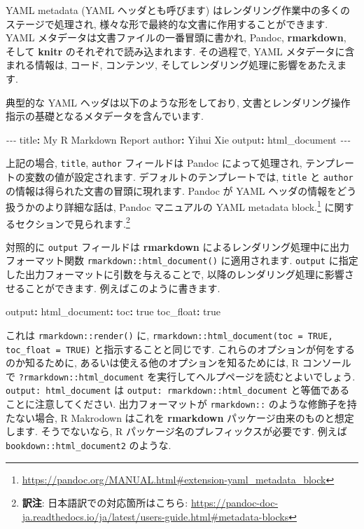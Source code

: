 \documentclass[
  11pt,
  lualatex,ja=standard,jafont=noto]{bxjsreport}
\newenvironment{Shaded}{\begin{snugshade}}{\end{snugshade}}
\newcommand{\AttributeTok}[1]{\textcolor[rgb]{0.77,0.63,0.00}{#1}}
\newcommand{\CharTok}[1]{\textcolor[rgb]{0.31,0.60,0.02}{#1}}
\newcommand{\FunctionTok}[1]{\textcolor[rgb]{0.00,0.00,0.00}{#1}}
\newcommand{\KeywordTok}[1]{\textcolor[rgb]{0.13,0.29,0.53}{\textbf{#1}}}
\newcommand{\PreprocessorTok}[1]{\textcolor[rgb]{0.56,0.35,0.01}{\textit{#1}}}
\renewcommand{\href}[2]{#2\footnote{\url{#1}}}
\begin{document}
YAML metadata (YAML ヘッダとも呼びます) はレンダリング作業中の多くのステージで処理され, 様々な形で最終的な文書に作用することができます. YAML メタデータは文書ファイルの一番冒頭に書かれ, Pandoc, \textbf{rmarkdown}, そして \textbf{knitr} のそれぞれで読み込まれます. その過程で, YAML メタデータに含まれる情報は, コード, コンテンツ, そしてレンダリング処理に影響をあたえます.

典型的な YAML ヘッダは以下のような形をしており, 文書とレンダリング操作指示の基礎となるメタデータを含んでいます.

\begin{Shaded}
\begin{Highlighting}[]
\PreprocessorTok{{-}{-}{-}}
\FunctionTok{title}\KeywordTok{:}\AttributeTok{ My R Markdown Report}
\FunctionTok{author}\KeywordTok{:}\AttributeTok{ Yihui Xie}
\FunctionTok{output}\KeywordTok{:}\AttributeTok{ html\_document}
\PreprocessorTok{{-}{-}{-}}
\end{Highlighting}
\end{Shaded}

上記の場合, \texttt{title}, \texttt{author} フィールドは Pandoc によって処理され, テンプレートの変数の値が設定されます. デフォルトのテンプレートでは, \texttt{title} と \texttt{author} の情報は得られた文書の冒頭に現れます. Pandoc が YAML ヘッダの情報をどう扱うかのより詳細な話は, Pandoc マニュアルの \href{https://pandoc.org/MANUAL.html\#extension-yaml_metadata_block}{YAML metadata block.} に関するセクションで見られます.\footnote{\textbf{訳注}: 日本語訳での対応箇所はこちら: \url{https://pandoc-doc-ja.readthedocs.io/ja/latest/users-guide.html\#metadata-blocks}}

対照的に \texttt{output} フィールドは \textbf{rmarkdown} によるレンダリング処理中に出力フォーマット関数 \texttt{rmarkdown::html\_document()} に適用されます. \texttt{output} に指定した出力フォーマットに引数を与えることで, 以降のレンダリング処理に影響させることができます. 例えばこのように書きます.

\begin{Shaded}
\begin{Highlighting}[]
\FunctionTok{output}\KeywordTok{:}
\AttributeTok{  }\FunctionTok{html\_document}\KeywordTok{:}
\AttributeTok{    }\FunctionTok{toc}\KeywordTok{:}\AttributeTok{ }\CharTok{true}
\AttributeTok{    }\FunctionTok{toc\_float}\KeywordTok{:}\AttributeTok{ }\CharTok{true}
\end{Highlighting}
\end{Shaded}

これは \texttt{rmarkdown::render()} に, \texttt{rmarkdown::html\_document(toc = TRUE, toc\_float = TRUE)} と指示することと同じです. これらのオプションが何をするのか知るために, あるいは使える他のオプションを知るためには, R コンソールで \texttt{?rmarkdown::html\_document} を実行してヘルプページを読むとよいでしょう. \texttt{output: html\_document} は \texttt{output: rmarkdown::html\_document} と等価であることに注意してください. 出力フォーマットが \texttt{rmarkdown::} のような修飾子を持たない場合, R Makrodown はこれを \textbf{rmarkdown} パッケージ由来のものと想定します. そうでないなら, R パッケージ名のプレフィックスが必要です. 例えば \texttt{bookdown::html\_document2} のような.
\end{document}
